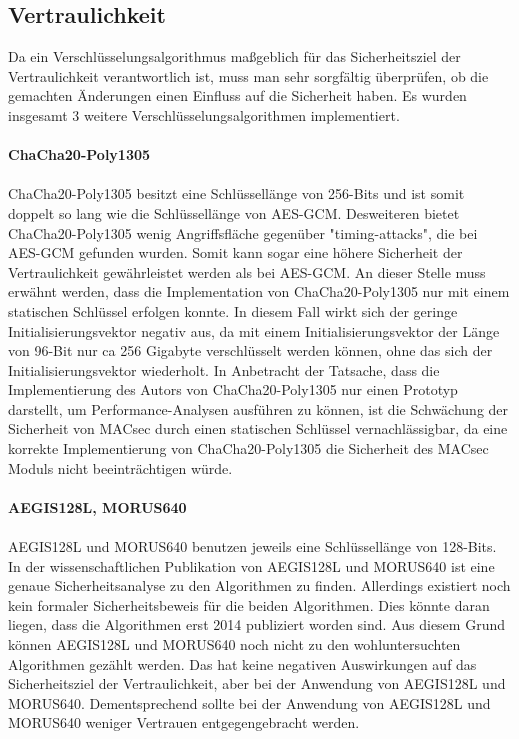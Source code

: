 \subsection{Vertraulichkeit}
Da ein Verschlüsselungsalgorithmus maßgeblich für das Sicherheitsziel der Vertraulichkeit verantwortlich ist, muss man sehr sorgfältig überprüfen, ob die gemachten Änderungen einen Einfluss auf die Sicherheit haben.
Es wurden insgesamt 3 weitere Verschlüsselungsalgorithmen implementiert. \\
\\
\textbf{ChaCha20-Poly1305}
\\
\\
ChaCha20-Poly1305 besitzt eine Schlüssellänge von 256-Bits und ist somit doppelt so lang wie die Schlüssellänge von \gls{AES-GCM}. Desweiteren bietet ChaCha20-Poly1305 wenig Angriffsfläche gegenüber "timing-attacks", die bei \gls{AES-GCM} gefunden wurden\cite{cache-collision-timing-attacks-against-aes}. Somit kann sogar eine höhere Sicherheit der Vertraulichkeit gewährleistet werden als bei AES-GCM. An dieser Stelle muss erwähnt werden, dass die Implementation von ChaCha20-Poly1305 nur mit einem statischen Schlüssel erfolgen konnte. In diesem Fall wirkt sich der geringe Initialisierungsvektor negativ aus, da mit einem Initialisierungsvektor der Länge von 96-Bit nur ca 256 Gigabyte verschlüsselt werden können, ohne das sich der Initialisierungsvektor wiederholt\cite{rfc7539}. In Anbetracht der Tatsache, dass die Implementierung des Autors von ChaCha20-Poly1305 nur einen Prototyp darstellt, um Performance-Analysen ausführen zu können, ist die Schwächung der Sicherheit von \gls{MACsec} durch einen statischen Schlüssel vernachlässigbar, da eine korrekte Implementierung von ChaCha20-Poly1305 die Sicherheit des MACsec Moduls nicht beeinträchtigen würde.\\
\\
\textbf{AEGIS128L, MORUS640}
\\
\\
AEGIS128L und MORUS640 benutzen jeweils eine Schlüssellänge von 128-Bits. In der wissenschaftlichen Publikation von AEGIS128L\cite{10.1007/978-3-662-43414-7_10} und MORUS640\cite{wuauthenticated} ist eine genaue Sicherheitsanalyse zu den Algorithmen zu finden. Allerdings existiert noch kein formaler Sicherheitsbeweis für die beiden Algorithmen. Dies könnte daran liegen, dass die Algorithmen erst 2014 publiziert worden sind. Aus diesem Grund können AEGIS128L und MORUS640 noch nicht zu den wohluntersuchten Algorithmen gezählt werden. Das hat keine negativen Auswirkungen auf das Sicherheitsziel der Vertraulichkeit, aber bei der Anwendung von AEGIS128L und MORUS640. Dementsprechend sollte bei der Anwendung von AEGIS128L und MORUS640 weniger Vertrauen entgegengebracht werden.

